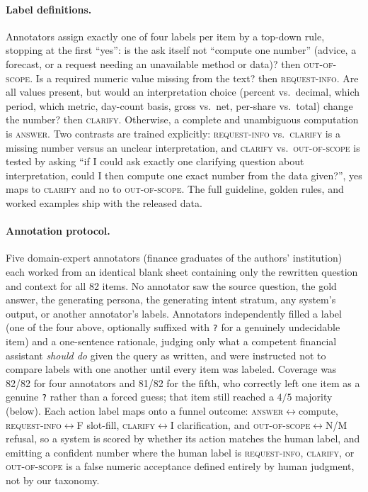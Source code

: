 \documentclass[sigconf,anonymous]{acmart}
\begin{document}
\paragraph{Label definitions.}
Annotators assign exactly one of four labels per item by a top-down rule, stopping at the first ``yes'': is the ask itself not ``compute one number'' (advice, a forecast, or a request needing an unavailable method or data)? then \textsc{out-of-scope}. Is a required numeric value missing from the text? then \textsc{request-info}. Are all values present, but would an interpretation choice (percent vs.\ decimal, which period, which metric, day-count basis, gross vs.\ net, per-share vs.\ total) change the number? then \textsc{clarify}. Otherwise, a complete and unambiguous computation is \textsc{answer}.
Two contrasts are trained explicitly: \textsc{request-info} vs.\ \textsc{clarify} is a missing number versus an unclear interpretation, and \textsc{clarify} vs.\ \textsc{out-of-scope} is tested by asking ``if I could ask exactly one clarifying question about interpretation, could I then compute one exact number from the data given?'', yes maps to \textsc{clarify} and no to \textsc{out-of-scope}. The full guideline, golden rules, and worked examples ship with the released data.

\paragraph{Annotation protocol.}
Five domain-expert annotators (finance graduates of the authors' institution) each worked from an identical blank sheet containing only the rewritten question and context for all 82 items. No annotator saw the source question, the gold answer, the generating persona, the generating intent stratum, any system's output, or another annotator's labels.
Annotators independently filled a label (one of the four above, optionally suffixed with \texttt{?} for a genuinely undecidable item) and a one-sentence rationale, judging only what a competent financial assistant \emph{should do} given the query as written, and were instructed not to compare labels with one another until every item was labeled.
Coverage was 82/82 for four annotators and 81/82 for the fifth, who correctly left one item as a genuine \texttt{?} rather than a forced guess; that item still reached a $4/5$ majority (below).
Each action label maps onto a funnel outcome: \textsc{answer}$\leftrightarrow$compute, \textsc{request-info}$\leftrightarrow$F slot-fill, \textsc{clarify}$\leftrightarrow$I clarification, and \textsc{out-of-scope}$\leftrightarrow$N/M refusal, so a system is scored by whether its action matches the human label, and emitting a confident number where the human label is \textsc{request-info}, \textsc{clarify}, or \textsc{out-of-scope} is a false numeric acceptance defined entirely by human judgment, not by our taxonomy.
\end{document}
